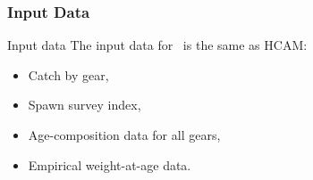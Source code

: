 \subsubsection{Input Data} %
\label{ssec:inputdata}
%
\begin{frame}
	{Input data} The input data for \iscam\ is the same as HCAM: 
	\begin{itemize}
		\item Catch by gear, 
		\item Spawn survey index, 
		\item Age-composition data for all gears, 
		\item Empirical weight-at-age data. 
	\end{itemize}
\end{frame}

